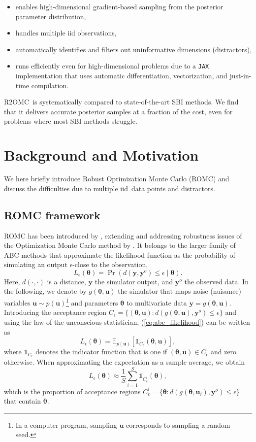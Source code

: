 \documentclass[twoside]{article}
\newcommand{\thb}{\boldsymbol{\theta}}
\newcommand{\ub}{\mathbf{u}}
\newcommand{\yb}{\mathbf{y}}
\newcommand{\data}{\mathbf{y}^o}
\newcommand{\accregioni}{C_{\epsilon}^i}
\newcommand{\E}{\mathbb{E}}
\newcommand{\rromc}{R2OMC}
\begin{document}
\begin{itemize}
 \item enables high-dimensional gradient-based sampling from the posterior parameter distribution,
 \item handles multiple iid observations,
 \item automatically identifies and filters out uninformative dimensions (distractors),
 \item runs efficiently even for high-dimensional problems due to a \texttt{JAX} implementation that uses automatic differentiation, vectorization, and just-in-time compilation.
\end{itemize} 
\rromc~is systematically compared to state-of-the-art SBI methods. We find that it delivers accurate posterior samples at a fraction of the cost, even for problems where most SBI methods struggle.

\section{Background and Motivation}
We here briefly introduce Robust Optimization Monte Carlo (ROMC) and discuss the difficulties due to multiple iid\ data points and distractors.

\subsection{ROMC framework}
\label{subsec:ROMC}
ROMC has been introduced by \citet{ikonomov2020robust}, extending and addressing robustness issues of the Optimization Monte Carlo method by \citet{meeds2015optimization}. It belongs to the larger family of ABC methods that approximate the likelihood function as the probability of simulating an output $\epsilon$-close to the observation,
\begin{equation}
L_\epsilon(\thb) = \Pr(d(\yb, \data) \leq \epsilon \mid \thb).
\label{eq:abc_likelihood}
\end{equation}
Here, $d(\cdot, \cdot)$ is a distance, $\yb$ the simulator output, and $\data$ the observed data. In the following, we denote by $g(\thb, \ub)$ the simulator that maps noise (nuisance) variables $\ub \sim p(\ub)$\footnote{In a computer program, sampling $\ub$ corresponds to sampling a random seed.} and parameters $\thb$ to multivariate data $\yb = g(\thb, \ub)$. Introducing the acceptance region $C_\epsilon = \{(\thb, \ub): d(g(\thb, \ub), \data)\le \epsilon\}$ and using the law of the unconscious statistician, (\ref{eq:abc_likelihood}) can be written as
\begin{equation}
    L_\epsilon(\thb) = \E_{p(\ub)}\left[\mathbb{1}_{C_\epsilon}(\thb, \ub) \right],
\end{equation}
where $\mathbb{1}_{C_\epsilon}$ denotes the indicator function that is one if $(\thb, \ub)\in C_\epsilon$ and zero otherwise. When approximating the expectation as a sample average, we obtain
\begin{equation}
    L_\epsilon(\thb) \approx \frac{1}{S} \sum_{i=1}^S \mathbb{1}_{\accregioni}(\thb),
    \label{eq:omc_likelihood}
\end{equation}
which is the proportion of acceptance regions $\accregioni = \{\thb : d(g(\thb, \ub_i), \data) \leq \epsilon \}$ that contain $\thb$.
\end{document}
